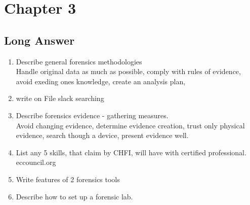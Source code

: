 \section{Chapter 3}
\subsection{Long Answer}
\begin{enumerate}
    \item Describe general forensics methodologies\\
    Handle original data as much as possible, comply with rules of evidence, avoid exeding ones knowledge, create an analysis plan,
    \item write on File slack searching
    \item Describe forensics evidence - gathering measures.\\
    Avoid changing evidence, determine evidence creation, trust only physical evidence, search though a device, present evidence well.
    \item List any 5 skills, that claim by CHFI, will have with certified professional.\\eccouncil.org
    \item Write features of 2 forensics tools
    \item Describe how to set up a forensic lab.
\end{enumerate}


